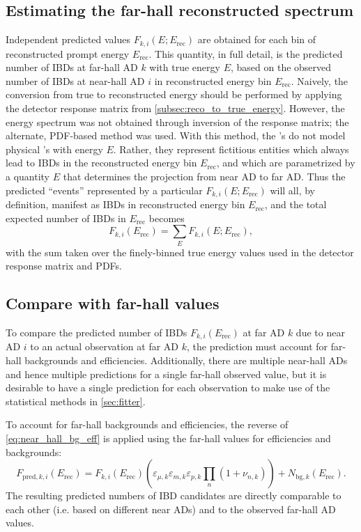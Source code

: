\subsection{Estimating the far-hall reconstructed spectrum}
\label{subsec:true_to_reco_farhall}

Independent predicted values $F_{k,i}(E;E_\text{rec})$ are obtained
for each bin of reconstructed prompt energy $E_\text{rec}$.
This quantity, in full detail,
is the predicted number of IBDs at far-hall AD $k$
with true \nuebar{} energy $E$,
based on the observed number of IBDs at near-hall AD $i$
in reconstructed energy bin $E_\text{rec}$.
Naively, the conversion from true to reconstructed energy
should be performed by applying the detector response matrix
from \cref{subsec:reco_to_true_energy}.
However, the \nuebar{} energy spectrum was not obtained
through inversion of the response matrix;
the alternate, PDF-based method was used.
With this method, the \nuebar{}'s do not model physical \nuebar{}'s with energy $E$.
Rather, they represent fictitious entities which always
lead to IBDs in the reconstructed energy bin $E_\text{rec}$,
and which are parametrized by a quantity $E$ that determines
the projection from near AD to far AD.
Thus the predicted ``events'' represented by a particular
$F_{k,i}(E;E_\text{rec})$ will all, by definition,
manifest as IBDs in reconstructed energy bin $E_\text{rec}$,
and the total expected number of IBDs in $E_\text{rec}$ becomes
\begin{equation}
    F_{k,i}(E_\text{rec}) = \sum_E F_{k,i}(E; E_\text{rec}),
\end{equation}
with the sum taken over the finely-binned true energy values
used in the detector response matrix and PDFs.

\subsection{Compare with far-hall values}
\label{subsec:far_bg_eff}

To compare the predicted number of IBDs $F_{k,i}(E_\text{rec})$
at far AD $k$ due to near AD $i$
to an actual observation at far AD $k$,
the prediction must account for far-hall backgrounds and efficiencies.
Additionally, there are multiple near-hall ADs
and hence multiple predictions for a single far-hall observed value,
but it is desirable to have a single prediction for each observation
to make use of the statistical methods in \cref{sec:fitter}.

To account for far-hall backgrounds and efficiencies,
the reverse of \cref{eq:near_hall_bg_eff} is applied
using the far-hall values for efficiencies and backgrounds:
\begin{equation}
    F_{\text{pred},k,i}(E_\text{rec}) = F_{k,i}(E_\text{rec})\left(
        \varepsilon_{\mu,k}\varepsilon_{m,k}\varepsilon_{p,k}
        \prod_n(1 + \nu_{n,k})
    \right)
    + N_{\text{bg},k}(E_\text{rec}).
\end{equation}
The resulting predicted numbers of IBD candidates
are directly comparable to each other (i.e. based on different near ADs)
and to the observed far-hall AD values.

